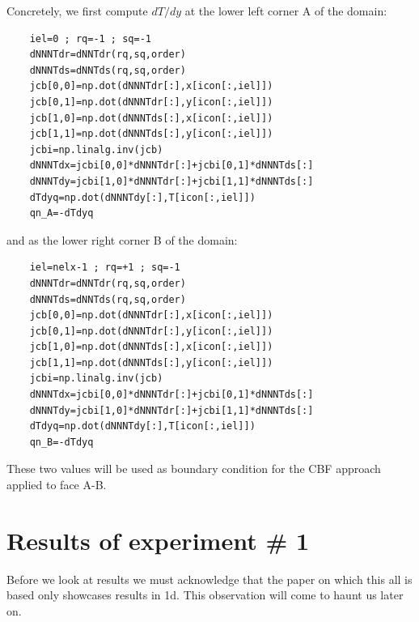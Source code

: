 Concretely, we first compute $dT/dy$ at the lower left corner A of the domain:
\begin{lstlisting}
    iel=0 ; rq=-1 ; sq=-1
    dNNNTdr=dNNTdr(rq,sq,order)
    dNNNTds=dNNTds(rq,sq,order)
    jcb[0,0]=np.dot(dNNNTdr[:],x[icon[:,iel]])
    jcb[0,1]=np.dot(dNNNTdr[:],y[icon[:,iel]])
    jcb[1,0]=np.dot(dNNNTds[:],x[icon[:,iel]])
    jcb[1,1]=np.dot(dNNNTds[:],y[icon[:,iel]])
    jcbi=np.linalg.inv(jcb)
    dNNNTdx=jcbi[0,0]*dNNNTdr[:]+jcbi[0,1]*dNNNTds[:]
    dNNNTdy=jcbi[1,0]*dNNNTdr[:]+jcbi[1,1]*dNNNTds[:]
    dTdyq=np.dot(dNNNTdy[:],T[icon[:,iel]])
    qn_A=-dTdyq
\end{lstlisting}
and as the lower right corner B of the domain:
\begin{lstlisting}
    iel=nelx-1 ; rq=+1 ; sq=-1
    dNNNTdr=dNNTdr(rq,sq,order)
    dNNNTds=dNNTds(rq,sq,order)
    jcb[0,0]=np.dot(dNNNTdr[:],x[icon[:,iel]])
    jcb[0,1]=np.dot(dNNNTdr[:],y[icon[:,iel]])
    jcb[1,0]=np.dot(dNNNTds[:],x[icon[:,iel]])
    jcb[1,1]=np.dot(dNNNTds[:],y[icon[:,iel]])
    jcbi=np.linalg.inv(jcb)
    dNNNTdx=jcbi[0,0]*dNNNTdr[:]+jcbi[0,1]*dNNNTds[:]
    dNNNTdy=jcbi[1,0]*dNNNTdr[:]+jcbi[1,1]*dNNNTds[:]
    dTdyq=np.dot(dNNNTdy[:],T[icon[:,iel]])
    qn_B=-dTdyq
\end{lstlisting}
These two values will be used as boundary condition for the CBF
approach applied to face A-B.






\newpage
\section*{Results of experiment \# 1}

Before we look at results we must acknowledge that the paper on which this all is based \cite{mizu86}
only showcases results in 1d. This observation will come to haunt us later on. 

